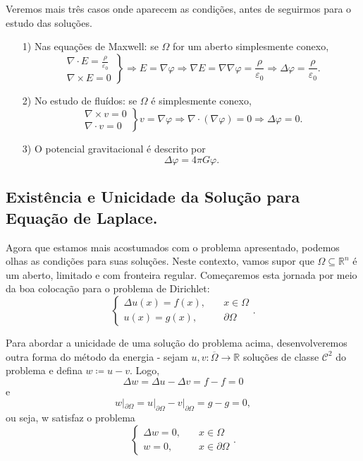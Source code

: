 \documentclass[../pde_notes.tex]{subfiles}
\begin{document}
Veremos mais três casos onde aparecem as condições, antes de seguirmos para o estudo das soluções.
\begin{example}
	\begin{itemize}
		\item[1)] Nas equações de Maxwell: se \(\Omega \) for um aberto simplesmente conexo,
		      \[
			      \left.\begin{array}{ll}
				      \nabla \cdot E = \frac{\rho }{\varepsilon_{0}} \\
				      \nabla \times E = 0
			      \end{array}\right\} \Rightarrow E = \nabla \varphi  \Rightarrow \nabla E = \nabla \nabla \varphi = \frac{\rho }{\varepsilon_{0}} \Rightarrow \Delta \varphi = \frac{\rho }{\varepsilon_{0}}.
		      \]
		\item[2)] No estudo de fluídos: se \(\Omega \) é simplesmente conexo,
		      \[
			      \left.\begin{array}{ll}
				      \nabla \times v = 0 \\
				      \nabla \cdot v = 0
			      \end{array}\right\} v = \nabla \varphi \Rightarrow \nabla \cdot (\nabla \varphi ) = 0 \Rightarrow \Delta \varphi = 0.
		      \]
		\item[3)] O potencial gravitacional é descrito por
		      \[
			      \Delta \varphi =4\pi G\varphi .
		      \]
	\end{itemize}
\end{example}

\subsection{Existência e Unicidade da Solução para Equação de Laplace.}
Agora que estamos mais acostumados com o problema apresentado, podemos olhas as condições para suas soluções. Neste contexto, vamos supor que \(\Omega \subseteq \mathbb{R}^{n}\) é um aberto, limitado e com fronteira regular. Começaremos esta jornada por meio da boa colocação para o problema de Dirichlet:
\[
	\left\{\begin{array}{ll}
		\Delta u(x) = f(x), & \quad x\in \Omega     \\
		u(x) = g(x),        & \quad \partial \Omega
	\end{array}\right..
\]

Para abordar a unicidade de uma solução do problema acima, desenvolveremos outra forma do método da energia - sejam \(u, v:\overline{\Omega }\rightarrow \mathbb{R}\) soluções de classe \(\mathcal{C}^{2}\) do problema e defina \(w\coloneqq u-v\). Logo,
\[
	\Delta w = \Delta u - \Delta v = f - f = 0
\]
e
\[
	w|_{\partial \Omega } = u|_{\partial \Omega } - v|_{\partial \Omega } = g - g = 0,
\]
ou seja, w satisfaz o problema
\[
	\left\{\begin{array}{ll}
		\Delta w = 0, & \quad x\in \Omega          \\
		w = 0,        & \quad x\in \partial \Omega
	\end{array}\right..
\]
\end{document}
